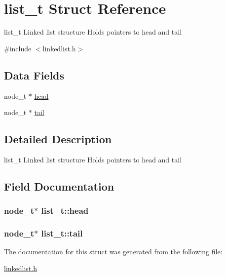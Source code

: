 \hypertarget{structlist}{}\section{list\+\_\+t Struct Reference}
\label{structlist}


list\+\_\+t Linked list structure Holds pointers to head and tail  




{\ttfamily \#include $<$linkedlist.\+h$>$}

\subsection*{Data Fields}
\begin{DoxyCompactItemize}
\item 
node\+\_\+t $\ast$ \hyperlink{structlist_a41ca53f3f5a14b999af80b8332137ca2}{head}
\item 
node\+\_\+t $\ast$ \hyperlink{structlist_aba8e9dd90ba0dc731f3e9efa8d2c8354}{tail}
\end{DoxyCompactItemize}


\subsection{Detailed Description}
list\+\_\+t Linked list structure Holds pointers to head and tail 

\subsection{Field Documentation}
\hypertarget{structlist_a41ca53f3f5a14b999af80b8332137ca2}{}
\subsubsection[{head}]{\setlength{\rightskip}{0pt plus 5cm}node\+\_\+t$\ast$ list\+\_\+t\+::head}\label{structlist_a41ca53f3f5a14b999af80b8332137ca2}
\hypertarget{structlist_aba8e9dd90ba0dc731f3e9efa8d2c8354}{}
\subsubsection[{tail}]{\setlength{\rightskip}{0pt plus 5cm}node\+\_\+t$\ast$ list\+\_\+t\+::tail}\label{structlist_aba8e9dd90ba0dc731f3e9efa8d2c8354}


The documentation for this struct was generated from the following file\+:\begin{DoxyCompactItemize}
\item 
\hyperlink{linkedlist_8h}{linkedlist.\+h}\end{DoxyCompactItemize}
